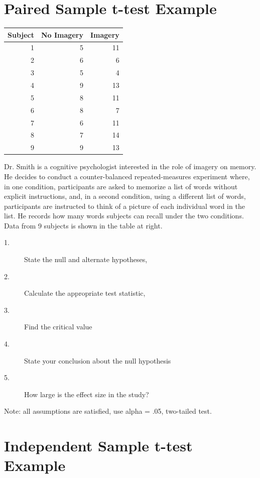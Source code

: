 \documentclass{tufte-handout}
\begin{document}
\section{Paired Sample t-test Example}

\begin{margintable}[80pt]
  \selectfont
  \begin{tabular}{rrr}
    \toprule
    Subject & No Imagery & Imagery\\
    \midrule
1&	5&	11\\
2&	6&	6\\
3&	5&	4\\
4&	9&	13\\
5&	8&	11\\
6&	8&	7\\
7&	6&	11\\
8&	7&	14\\
9&	9&	13\\
    \bottomrule
  \end{tabular}
  \label{tab:normaltab}
\end{margintable}


Dr. Smith is a cognitive psychologist interested in the role of imagery on memory. He decides to conduct a counter-balanced repeated-measures experiment where, in one condition, participants are asked to memorize a list of words without explicit instructions, and, in a second condition, using a different list of words, participants are instructed to think of a picture of each individual word in the list. He records how many words subjects can recall under the two conditions. Data from 9 subjects is shown in the table at right.

\begin{description}
\item[1.] State the null and alternate hypotheses, 
\item[2.] Calculate the appropriate test statistic, 
\item[3.] Find the critical value 
\item[4.] State your conclusion about the null hypothesis 
\item[5.] How large is the effect size in the study?
\end{description}

Note: all assumptions are satisfied, use alpha = .05, two-tailed test.

\pagebreak
\section{Independent Sample t-test Example}
\end{document}
